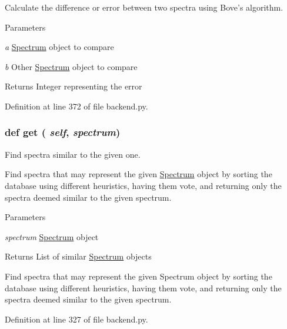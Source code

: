 Calculate the difference or error between two spectra using Bove's algorithm. 


\begin{DoxyParams}{Parameters}
\item[{\em a}]\hyperlink{classbackend_1_1_spectrum}{Spectrum} object to compare \item[{\em b}]Other \hyperlink{classbackend_1_1_spectrum}{Spectrum} object to compare \end{DoxyParams}
\begin{DoxyReturn}{Returns}
Integer representing the error 
\end{DoxyReturn}


Definition at line 372 of file backend.py.

\hypertarget{classbackend_1_1_matcher_a444a1328efb32d5d9d2dcb2efe855d3b}{
\subsubsection[{get}]{\setlength{\rightskip}{0pt plus 5cm}def get ( {\em self}, \/   {\em spectrum})}}
\label{classbackend_1_1_matcher_a444a1328efb32d5d9d2dcb2efe855d3b}


Find spectra similar to the given one. 

Find spectra that may represent the given \hyperlink{classbackend_1_1_spectrum}{Spectrum} object by sorting the database using different heuristics, having them vote, and returning only the spectra deemed similar to the given spectrum.


\begin{DoxyParams}{Parameters}
\item[{\em spectrum}]\hyperlink{classbackend_1_1_spectrum}{Spectrum} object \end{DoxyParams}
\begin{DoxyReturn}{Returns}
List of similar \hyperlink{classbackend_1_1_spectrum}{Spectrum} objects\begin{DoxyVerb}Find spectra that may represent the given Spectrum object by sorting
the database using different heuristics, having them vote, and returning only
the spectra deemed similar to the given spectrum.\end{DoxyVerb}
 
\end{DoxyReturn}


Definition at line 327 of file backend.py.

